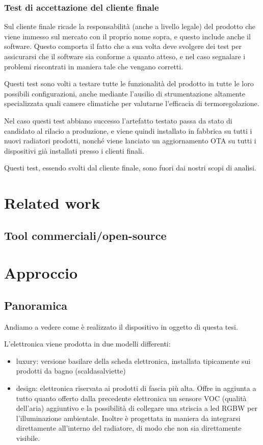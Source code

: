 \documentclass{article}
\begin{document}
\subsubsection{Test di accettazione del cliente finale}

Sul cliente finale ricade la responsabilità (anche a livello legale) del prodotto
che viene immesso sul mercato con il proprio nome sopra, e questo include anche
il software. Questo comporta il fatto che a sua volta deve svolgere dei test per
assicurarsi che il software sia conforme a quanto atteso, e nel caso segnalare i
problemi riscontrati in maniera tale che vengano corretti.

Questi test sono volti a testare tutte le funzionalità del prodotto in tutte le loro
possibili configurazioni, anche mediante l'ausilio di strumentazione altamente
specializzata quali camere climatiche per valutarne l'efficacia di termoregolazione.

Nel caso questi test abbiano successo l'artefatto testato passa da stato di candidato
al rilacio a produzione, e viene quindi installato in fabbrica su tutti i nuovi radiatori
prodotti, nonché viene lanciato un aggiornamento OTA su tutti i dispositivi già installati
presso i clienti finali.

Questi test, essendo svolti dal cliente finale, sono fuori dai nostri scopi di analisi.

\section{Related work}
\subsection{Tool commerciali/open-source}

\section{Approccio}
\subsection{Panoramica}

Andiamo a vedere come è realizzato il dispositivo in oggetto di questa tesi.

L'elettronica viene prodotta in due modelli differenti:
\begin{itemize}
    \item luxury: versione basilare della scheda elettronica, installata tipicamente
        sui prodotti da bagno (scaldasalviette)
    \item design: elettronica riservata ai prodotti di fascia più alta. Offre in
        aggiunta a tutto quanto offerto dalla precedente elettronica un sensore VOC
        (qualità dell'aria) aggiuntivo e la possibilità di collegare una striscia a
        led RGBW per l'illuminazione ambientale. Inoltre è progettata in maniera da
        integrarsi direttamente all'interno del radiatore, di modo che non sia direttamente
        visibile.
\end{itemize}
\end{document}
